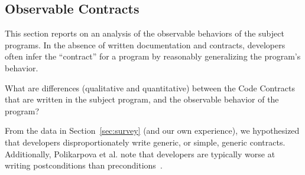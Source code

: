 
\subsection{Observable Contracts}
\label{sec:celeriac}

This section reports on an analysis of the observable behaviors
of the subject programs.
%
In the absence of written documentation and contracts, developers
often infer the ``contract'' for a program by reasonably generalizing
the program's behavior.





%

\begin{research-question}
  What are differences (qualitative and quantitative) between the Code
  Contracts that are written in the subject program, and the observable
  behavior of the program?
\end{research-question}

From the data in Section~\ref{sec:survey} (and our own experience), we
hypothesized that developers disproportionately write generic, or
simple, generic contracts. Additionally, Polikarpova et al. note that
developers are typically worse at writing postconditions than
preconditions~\cite{Polikarpova2012}.

